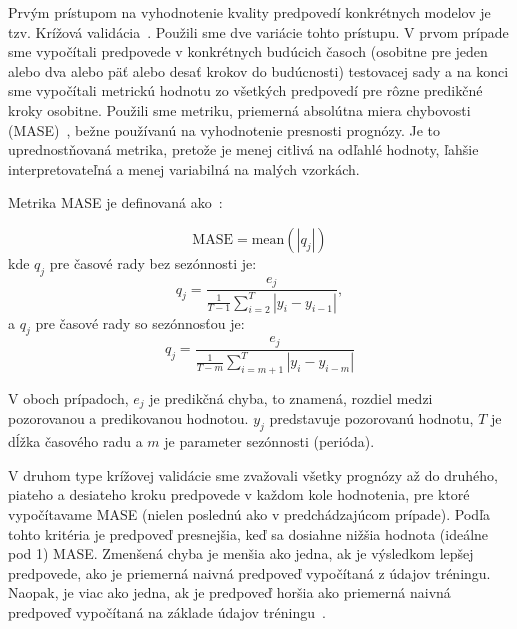 \documentclass[thesismargins, thesislinespacing, openright, upjsfrontpage, combineabstracts]{rnthesis}
\begin{document}

Prvým prístupom na vyhodnotenie kvality predpovedí konkrétnych modelov je tzv. Krížová validácia~\cite {hyndman2018forecasting}. Použili sme dve variácie tohto prístupu. V prvom prípade sme vypočítali predpovede v konkrétnych budúcich časoch (osobitne pre jeden alebo dva alebo päť alebo desať krokov do budúcnosti) testovacej sady a na konci sme vypočítali metrickú hodnotu zo všetkých predpovedí pre rôzne predikčné kroky osobitne. Použili sme metriku, priemerná absolútna miera chybovosti (MASE)~\cite{hyndman2006another}, bežne používanú na vyhodnotenie presnosti prognózy.
Je to uprednostňovaná metrika, pretože je menej citlivá na odľahlé hodnoty, ľahšie interpretovateľná a menej variabilná na malých vzorkách.

Metrika MASE je definovaná ako~\cite{hyndman2018forecasting}:

% 
\begin{equation}
\textrm{MASE} = \textrm{mean}(|q_j|)
\end{equation}
% 
kde $q_j$ pre časové rady bez sezónnosti je:
% 
\begin{equation} 
q_j= \frac{e_j}{\frac{1}{T-1} \sum_{i=2}^{T}|y_i - y_{i-1}|},
\end{equation}
% 
a $q_j$ pre časové rady so sezónnosťou je:
% 
\begin{equation} 
q_j = \frac{e_j}{\frac{1}{T-m} \sum_{i=m+1}^{T}|y_i - y_{i-m}|}
\end{equation}

V oboch prípadoch, $e_j$ je predikčná chyba, to znamená, rozdiel medzi pozorovanou a predikovanou hodnotou. $y_j$ predstavuje pozorovanú hodnotu, $T$ je dĺžka časového radu a $m$ je parameter sezónnosti (perióda).

V druhom type krížovej validácie sme zvažovali všetky prognózy až do druhého, piateho a desiateho kroku predpovede v každom kole hodnotenia, pre ktoré vypočítavame MASE (nielen poslednú ako v predchádzajúcom prípade). Podľa tohto kritéria je predpoveď presnejšia, keď sa dosiahne nižšia hodnota (ideálne pod 1) MASE. Zmenšená chyba je menšia ako jedna, ak je výsledkom lepšej predpovede, ako je priemerná naivná predpoveď vypočítaná z údajov tréningu. Naopak, je viac ako jedna, ak je predpoveď horšia ako priemerná naivná predpoveď vypočítaná na základe údajov tréningu~\cite{hyndman2014measuring}.
\end{document}
